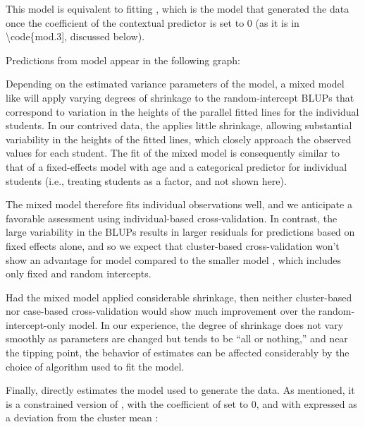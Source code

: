 \documentclass[
]{jss}
\begin{document}
This model is equivalent to fitting
, which is the model that
generated the data once the coefficient of the contextual predictor
 is set to 0 (as it is in \textbackslash code\{mod.3{]},
discussed below).

Predictions from model  appear in the following graph:

Depending on the estimated variance parameters of the model, a mixed
model like  will apply varying degrees of shrinkage to the
random-intercept BLUPs that correspond to variation in the heights of
the parallel fitted lines for the individual students. In our contrived
data, the  applies little shrinkage, allowing substantial
variability in the heights of the fitted lines, which closely approach
the observed values for each student. The fit of the mixed model
 is consequently similar to that of a fixed-effects model
with age and a categorical predictor for individual students (i.e.,
treating students as a factor, and not shown here).

The mixed model  therefore fits individual observations
well, and we anticipate a favorable assessment using individual-based
cross-validation. In contrast, the large variability in the BLUPs
results in larger residuals for predictions based on fixed effects
alone, and so we expect that cluster-based cross-validation won't show
an advantage for model  compared to the smaller model
, which includes only fixed and random intercepts.

Had the mixed model applied considerable shrinkage, then neither
cluster-based nor case-based cross-validation would show much
improvement over the random-intercept-only model. In our experience, the
degree of shrinkage does not vary smoothly as parameters are changed but
tends to be ``all or nothing,'' and near the tipping point, the behavior
of estimates can be affected considerably by the choice of algorithm
used to fit the model.

Finally,  directly estimates the model used to generate the
data. As mentioned, it is a constrained version of , with
the coefficient of  set to 0, and with  expressed as a
deviation from the cluster mean :
\end{document}
